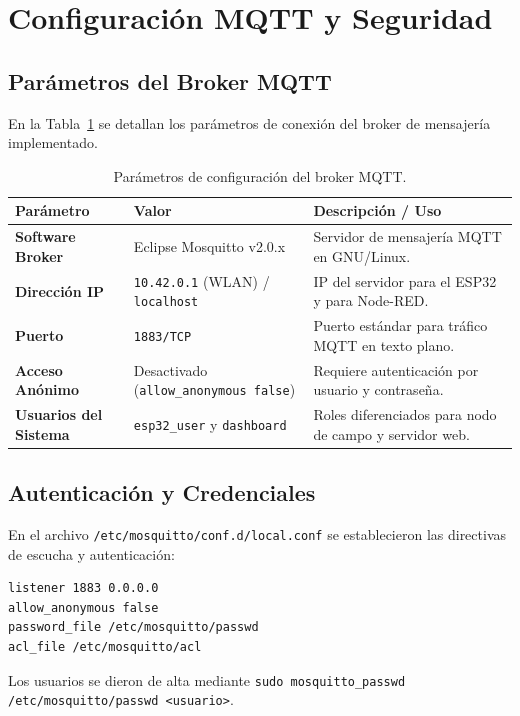 \section{Configuración MQTT y Seguridad}

\subsection{Parámetros del Broker MQTT}
En la Tabla~\ref{tab:config_broker} se detallan los parámetros de conexión del broker de mensajería implementado.

\begin{table}[H]
\centering
\small
\begin{tabularx}{\textwidth}{l p{4.5cm} X}
\toprule
\textbf{Parámetro} & \textbf{Valor} & \textbf{Descripción / Uso} \\
\midrule
\textbf{Software Broker} & Eclipse Mosquitto v2.0.x & Servidor de mensajería MQTT en GNU/Linux. \\
\textbf{Dirección IP} & \texttt{10.42.0.1} (WLAN) / \texttt{localhost} & IP del servidor para el ESP32 y para Node-RED. \\
\textbf{Puerto} & \texttt{1883/TCP} & Puerto estándar para tráfico MQTT en texto plano. \\
\textbf{Acceso Anónimo} & Desactivado (\texttt{allow\_anonymous false}) & Requiere autenticación por usuario y contraseña. \\
\textbf{Usuarios del Sistema} & \texttt{esp32\_user} y \texttt{dashboard} & Roles diferenciados para nodo de campo y servidor web. \\
\bottomrule
\end{tabularx}
\caption{Parámetros de configuración del broker MQTT.}
\label{tab:config_broker}
\end{table}

\subsection{Autenticación y Credenciales}
En el archivo \texttt{/etc/mosquitto/conf.d/local.conf} se establecieron las directivas de escucha y autenticación:
\begin{lstlisting}[style=custombash]
listener 1883 0.0.0.0
allow_anonymous false
password_file /etc/mosquitto/passwd
acl_file /etc/mosquitto/acl
\end{lstlisting}
Los usuarios se dieron de alta mediante \texttt{sudo mosquitto\_passwd /etc/mosquitto/passwd <usuario>}.


